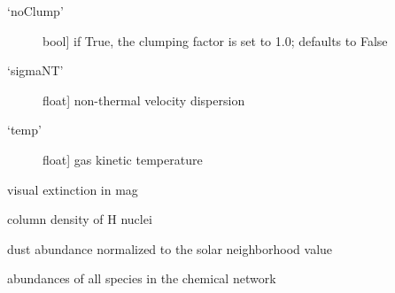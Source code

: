 \documentclass[letterpaper,10pt,english]{sphinxmanual}
\begin{document}
\begin{fulllineitems}
\begin{description}
\begin{description}
\item[{`noClump'}] \leavevmode{[}bool{]}
if True, the clumping factor is set to 1.0; defaults to False

\item[{`sigmaNT'}] \leavevmode{[}float{]}
non-thermal velocity dispersion

\item[{`temp'}] \leavevmode{[}float{]}
gas kinetic temperature

\end{description}

\end{description}

\begin{fulllineitems}
\label{fulldoc:despotic.chemistry.NL99_GC.AV}
visual extinction in mag

\end{fulllineitems}


\begin{fulllineitems}
\label{fulldoc:despotic.chemistry.NL99_GC.NH}
column density of H nuclei

\end{fulllineitems}


\begin{fulllineitems}
\label{fulldoc:despotic.chemistry.NL99_GC.Zd}
dust abundance normalized to the solar neighborhood value

\end{fulllineitems}


\begin{fulllineitems}
\label{fulldoc:despotic.chemistry.NL99_GC.abundances}
abundances of all species in the chemical network

\end{fulllineitems}



\end{fulllineitems}
\end{document}
